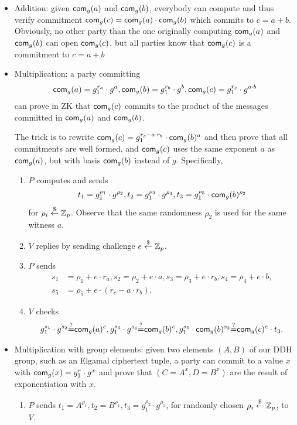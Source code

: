 \begin{itemize}
\item Addition: given $\mathsf{com}_g(a)$ and $\mathsf{com}_g(b)$, everybody can
  compute and thus verify commitment
  $\mathsf{com}_g(c)=\mathsf{com}_g(a)\cdot{}\mathsf{com}_g(b)$ which commits to
  $c=a+b$. Obviously, no other party than the one originally computing
  $\mathsf{com}_g(a)$ and $\mathsf{com}_g(b)$ can open $\mathsf{com}_g(c)$, but all parties
  know that $\mathsf{com}_g(c)$ is a commitment to $c=a+b$
  
\item Multiplication: a party committing
  \begin{align*}
  \mathsf{com}_g(a)=g_1^{r_a}\cdot{}g^a, \mathsf{com}_g(b)=g_1^{r_b}\cdot{}g^b,
  \mathsf{com}_g(c)=g_1^{r_c}\cdot{}g^{a\cdot{}b}
  \end{align*}
  can prove in ZK that
  $\mathsf{com}_g(c)$ commits to the product of the messages committed in
  $\mathsf{com}_g(a)$ and $\mathsf{com}_g(b)$.

  The trick is to rewrite
  $\mathsf{com}_g(c)=g_1^{r_c-a\cdot{}r_b}\cdot\mathsf{com}_g(b)^{a}$ and then prove
  that all commitments are well formed, and $\mathsf{com}_g(c)$ uses the same
  exponent $a$ as $\mathsf{com}_g(a)$, but with basis $\mathsf{com}_g(b)$ instead of
  $g$. Specifically,
  \begin{enumerate}
  \item $P$ computes and sends
    \begin{align*}
      t_1=g_1^{\rho_1}\cdot{}g^{\rho_2},
      t_2=g_1^{\rho_3}\cdot{}g^{\rho_4},
      t_3=g_1^{\rho_5}\cdot{}\mathsf{com}_g(b)^{\rho_2}
      \end{align*}
      for $\rho_i\stackrel{\$}{\leftarrow}\mathbb{Z}_p$. Observe that the same randomness $\rho_2$
      is used for the same witness $a$.
    \item $V$ replies by sending challenge $e\stackrel{\$}{\leftarrow}\mathbb{Z}_p$.
    \item $P$ sends
      \begin{align*}
        s_1&=\rho_1+e\cdot{}r_a,s_2=\rho_2+e\cdot{}a,s_3=\rho_3+e\cdot{}r_b,s_4=\rho_4+e\cdot{}b,\\s_5&=\rho_5+e\cdot{}(r_c-a\cdot{}r_b).
        \end{align*}
    \item $V$ checks
      \begin{align*}
        g_1^{s_1}\cdot{}g^{s_2}{\stackrel{?}{=}}{}\mathsf{com}_g(a)^e, g_1^{s_3}\cdot{}g^{s_4}{\stackrel{?}{=}}{}\mathsf{com}_g(b)^e, g_1^{s_5}\cdot{}\mathsf{com}_g(b)^{s_2}{\stackrel{?}{=}}{}\mathsf{com}_g(c)^e\cdot{}t_3.
        \end{align*}
\end{enumerate}

  \item Multiplication with group elements: given two elements $(A,B)$
    of our DDH group, such as an Elgamal ciphertext tuple, a party can
    commit to a value $x$ with $\mathsf{com}_g(x) =g_1^r\cdot{}g^x$ and prove
    that $(C=A^x,D=B^x)$ are the result of exponentiation with $x$.
    \begin{enumerate}
      \item $P$ sends $t_1=A^{\rho_1},t_2=B^{\rho_1},
        t_3=g_1^{\rho_2}\cdot{}g^{\rho_1}$, for randomly chosen
        $\rho_i\stackrel{\$}{\leftarrow}\mathbb{Z}_p$, to $V$.


\end{enumerate}
\end{itemize}
